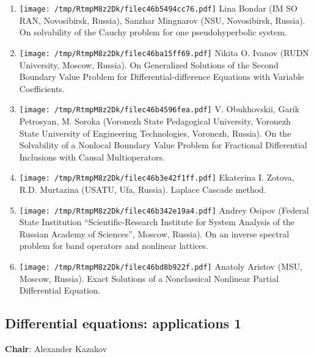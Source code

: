 \documentclass[
]{article}
\providecommand{\tightlist}{%
  \setlength{\itemsep}{0pt}\setlength{\parskip}{0pt}}
\begin{document}
\begin{enumerate}
\def\labelenumi{\arabic{enumi}.}
\tightlist
\item
  \protect\texttt{[image: /tmp/RtmpM8z2Dk/filec46b5494cc76.pdf]}
  Lina Bondar (IM SO RAN, Novosibirsk, Russia), Sanzhar Mingnarov (NSU,
  Novosibirsk, Russia). On solvability of the Cauchy problem for one
  pseudohyperbolic system.
\item
  \protect\texttt{[image: /tmp/RtmpM8z2Dk/filec46ba15ff69.pdf]}
  Nikita O. Ivanov (RUDN University, Moscow, Russia). On Generalized
  Solutions of the Second Boundary Value Problem for
  Differential-difference Equations with Variable Coefficients.
\item
  \protect\texttt{[image: /tmp/RtmpM8z2Dk/filec46b4596fea.pdf]}
  V. Obukhovskii, Garik Petrosyan, M. Soroka (Voronezh State Pedagogical
  University, Voronezh State University of Engineering Technologies,
  Voronezh, Russia). On the Solvability of a Nonlocal Boundary Value
  Problem for Fractional Differential Inclusions with Causal
  Multioperators.
\item
  \protect\texttt{[image: /tmp/RtmpM8z2Dk/filec46b3e42f1ff.pdf]}
  Ekaterina I. Zotova, R.D. Murtazina (USATU, Ufa, Russia). Laplace
  Cascade method.
\item
  \protect\texttt{[image: /tmp/RtmpM8z2Dk/filec46b342e19a4.pdf]}
  Andrey Osipov (Federal State Institution ``Scientific-Research
  Institute for System Analysis of the Russian Academy of Sciences'',
  Moscow, Russia). On an inverse spectral problem for band operators and
  nonlinear lattices.
\item
  \protect\texttt{[image: /tmp/RtmpM8z2Dk/filec46bd8b922f.pdf]}
  Anatoly Aristov (MSU, Moscow, Russia). Exact Solutions of a
  Nonclassical Nonlinear Partial Differential Equation.
\end{enumerate}

\hypertarget{dea1}{%
\subsection{Differential equations: applications 1}\label{dea1}}

\textbf{Chair}: Alexander Kazakov
\end{document}
